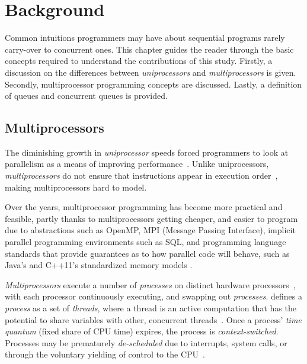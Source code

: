 \chapter{Background}
Common intuitions programmers may have about sequential programs rarely
carry-over to concurrent ones. This chapter guides the reader through the basic
concepts required to understand the contributions of this study. 
Firstly, a discussion on the differences between \emph{uniprocessors} and
\emph{multiprocessors} is given. Secondly, multiprocessor programming concepts
are discussed. Lastly, a definition of queues and concurrent queues is provided.

\section{Multiprocessors}
The diminishing growth in \emph{uniprocessor} speeds
forced programmers to look at parallelism as a means of improving
performance~\citep{cantrill2008real}. Unlike uniprocessors, \emph{multiprocessors} do
not ensure that instructions appear in execution order~\cite{scott2013shared},
making multiprocessors hard to model.


Over the years, multiprocessor programming has become more practical and
feasible, partly thanks to multiprocessors getting cheaper, and
easier to program due to abstractions such as OpenMP, MPI (Message Passing
Interface), implicit parallel programming environments such as SQL, and
programming language standards that provide guarantees as to how parallel code will
behave, such as Java's\citep{javamemorymodel2014} and C++11's
\citep{cppmemorymodel} standardized memory models
\citep[Chapter~2.2]{perfbook2021}.

\emph{Multiprocessors} execute a number of \emph{processes} on distinct
hardware processors~\citep[Appendix~B.2]{herlihy2020art}, with each processor
continuously executing, and swapping out \emph{processes}.
\citeauthor{scott2013shared} defines a \emph{process} as a set of
\emph{threads}, where a thread is an active computation that has the potential
to share variables with other, concurrent threads~\citep[p.6]{scott2013shared}.
Once a process' \emph{time quantum} (fixed share of CPU time) expires, the
process is \emph{context-switched}. Processes
may be prematurely \emph{de-scheduled} due to interrupts,
system calls, or through the voluntary yielding of control to the CPU~\citep[Section~3.2.3]{osconcepts2021}.

